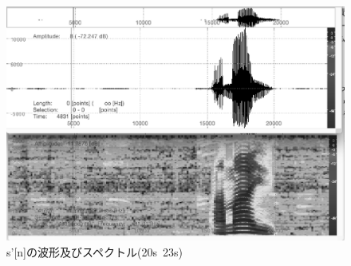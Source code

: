 \documentclass[a4j,12]{jarticle}
\begin{document}
       \begin{figure}[htpb]
         \begin{center}
           \includegraphics[width=15cm]{s_s.eps}%
           \caption{s'[n]の波形及びスペクトル(20s~23s)}
           \label{micon}
         \end{center}
       \end{figure}

       
\end{document}
